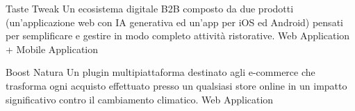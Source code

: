
\begin{projects}
    \project
    {Taste Tweak}{}
    {}
    {Un ecosistema digitale B2B composto da due prodotti (un'applicazione web con IA generativa ed un'app per iOS ed Android) pensati per semplificare e gestire in modo completo attività ristorative.}
    {Web Application + Mobile Application}

    \project
    {Boost Natura}{}
    {}
    {Un plugin multipiattaforma destinato agli e-commerce che trasforma ogni acquisto effettuato presso un qualsiasi store online in un impatto significativo contro il cambiamento climatico.}
    {Web Application}


\end{projects}
